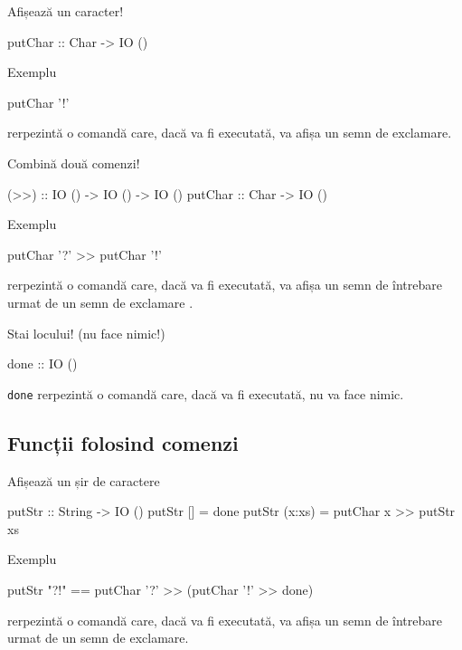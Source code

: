 \documentclass[xcolor=pdftex,romanian,colorlinks]{beamer}
\begin{document}
\begin{frame}[fragile]{Afișează un caracter!}
\begin{asciihs}
   putChar :: Char -> IO ()
\end{asciihs}
\begin{block}{Exemplu}
\begin{asciihs}
   putChar '!'
\end{asciihs}
rerpezintă o comandă care, \alert{dacă va fi executată}, va afișa un semn de exclamare.
\end{block}

\end{frame}

\begin{frame}[fragile]{Combină două comenzi!}
\begin{asciihs}
   (>>) :: IO () -> IO () -> IO ()
   putChar :: Char -> IO ()
\end{asciihs}
\begin{block}{Exemplu}
\begin{asciihs}
      putChar '?' >> putChar '!'
\end{asciihs}
rerpezintă o comandă care, \alert{dacă va fi executată}, va afișa un semn de întrebare urmat de un semn de exclamare .
\end{block}
\end{frame}

\begin{frame}[fragile]{Stai locului! (nu face nimic!)}
\begin{asciihs}
   done :: IO ()
\end{asciihs}

\lstinline$done$ rerpezintă o comandă care, \alert{dacă va fi executată}, nu va face nimic.
\end{frame}

\subsection{Funcții folosind comenzi}

\begin{frame}[fragile]{Afișează un șir de caractere}
\begin{asciihs}
   putStr :: String -> IO ()
   putStr []     = done
   putStr (x:xs) = putChar x >> putStr xs
\end{asciihs}

\begin{block}{Exemplu}
\begin{asciihs}
      putStr "?!" == putChar '?' >> (putChar '!' >> done)
\end{asciihs}
rerpezintă o comandă care, \alert{dacă va fi executată}, va afișa un semn de întrebare urmat de un semn de exclamare.
\end{block}
\end{frame}
\end{document}
